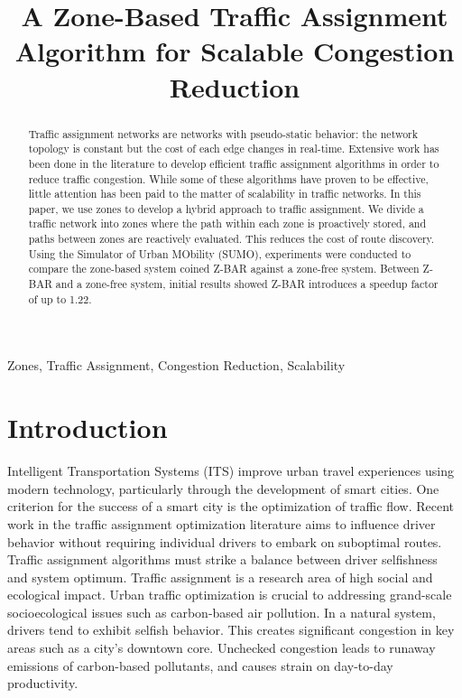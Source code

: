 \documentclass[12pt,conference]{IEEEtran}
\begin{document}
\raggedbottom

\title{A Zone-Based Traffic Assignment Algorithm for Scalable Congestion Reduction}
\author{
}

\maketitle

\begin{abstract}
Traffic assignment networks are networks with pseudo-static behavior: the network topology is constant but the cost of each edge changes in real-time. Extensive work has been done in the literature to develop efficient traffic assignment algorithms in order to reduce traffic congestion. While some of these algorithms have proven to be effective, little attention has been paid to the matter of scalability in traffic networks. In this paper, we use zones to develop a hybrid approach to traffic assignment. We divide a traffic network into zones where the path within each zone is proactively stored, and paths between zones are reactively evaluated. This reduces the cost of route discovery. Using the Simulator of Urban MObility (SUMO), experiments were conducted to compare the zone-based system coined Z-BAR against a zone-free system. Between Z-BAR and a zone-free system, initial results showed Z-BAR introduces a speedup factor of up to 1.22.
\end{abstract}

\begin{IEEEkeywords}
Zones, Traffic Assignment, Congestion Reduction, Scalability
\end{IEEEkeywords}

\IEEEpeerreviewmaketitle

\section{Introduction}

Intelligent Transportation Systems (ITS) improve urban travel experiences using modern technology, particularly through the development of smart cities. One criterion for the success of a smart city is the optimization of traffic flow. Recent work in the traffic assignment optimization literature aims to influence driver behavior without requiring individual drivers to embark on suboptimal routes. Traffic assignment algorithms must strike a balance between driver selfishness and system optimum. Traffic assignment is a research area of high social and ecological impact. Urban traffic optimization is crucial to addressing grand-scale socioecological issues such as carbon-based air pollution. In a natural system, drivers tend to exhibit selfish behavior. This creates significant congestion in key areas such as a city's downtown core. Unchecked congestion leads to runaway emissions of carbon-based pollutants, and causes strain on day-to-day productivity.
\end{document}
